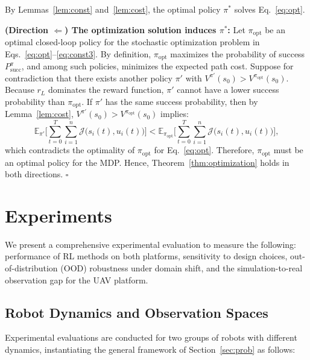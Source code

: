 \documentclass{article}
\begin{document}
By Lemmas~\ref{lem:const} and~\ref{lem:cost}, the optimal policy $\pi^*$ solves Eq.~\eqref{eq:opt}.

\textbf{(Direction $\Leftarrow$) The optimization solution induces $\pi^*$:} Let $\pi_{\mathrm{opt}}$ be an optimal closed-loop policy for the stochastic optimization problem in Eqs.~\eqref{eq:opt}--\eqref{eq:const3}. By definition, $\pi_{\mathrm{opt}}$ maximizes the probability of success $P_{\mathrm{succ}}^\pi$, and among such policies, minimizes the expected path cost. Suppose for contradiction that there exists another policy $\pi'$ with $V^{\pi'}(s_0) > V^{\pi_{\mathrm{opt}}}(s_0)$. Because $r_L$ dominates the reward function, $\pi'$ cannot have a lower success probability than $\pi_{\mathrm{opt}}$. If $\pi'$ has the same success probability, then by Lemma~\ref{lem:cost}, $V^{\pi'}(s_0) > V^{\pi_{\mathrm{opt}}}(s_0)$ implies:
\[
\mathbb{E}_{\pi'} \Big[\sum_{t=0}^T \sum_{i=1}^n \mathcal{J} \big(s_i(t), u_i(t)\big)\Big]
< \mathbb{E}_{\pi_{\mathrm{opt}}} \Big[\sum_{t=0}^T \sum_{i=1}^n \mathcal{J} \big(s_i(t), u_i(t)\big)\Big],
\]
which contradicts the optimality of $\pi_{\mathrm{opt}}$ for Eq.~\eqref{eq:opt}. Therefore, $\pi_{\mathrm{opt}}$ must be an optimal policy for the MDP. Hence, Theorem~\ref{thm:optimization} holds in both directions. \hfill$\square$

\section{Experiments}
\label{sec:exp}

We present a comprehensive experimental evaluation to measure the following: performance of RL methods on both platforms, sensitivity to design choices, out-of-distribution (OOD) robustness under domain shift, and the simulation-to-real observation gap for the UAV platform.

\subsection{Robot Dynamics and Observation Spaces}
\label{sec:exp:dynamics}

Experimental evaluations are conducted for two groups of robots with different dynamics, instantiating the general framework of Section~\ref{sec:prob} as follows:
\end{document}
